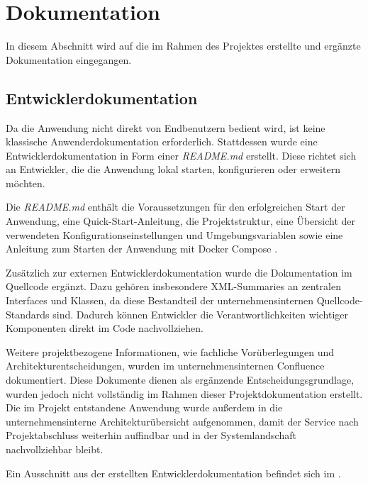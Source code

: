 \section{Dokumentation}
\label{sec:Dokumentation}
In diesem Abschnitt wird auf die im Rahmen des Projektes erstellte und ergänzte Dokumentation eingegangen.

\subsection{Entwicklerdokumentation}
\label{sec:Entwicklerdokumentation}
Da die Anwendung nicht direkt von Endbenutzern bedient wird, ist keine klassische Anwenderdokumentation erforderlich.
Stattdessen wurde eine Entwicklerdokumentation in Form einer \textit{README.md} erstellt.
Diese richtet sich an Entwickler, die die Anwendung lokal starten, konfigurieren oder erweitern möchten.
\par\smallskip
Die \textit{README.md} enthält die Voraussetzungen für den erfolgreichen Start der Anwendung,
eine Quick-Start-Anleitung, die Projektstruktur, eine Übersicht der verwendeten Konfigurationseinstellungen
und Umgebungsvariablen sowie eine Anleitung zum Starten der Anwendung mit Docker Compose \cite{DockerComposeDocs}.
\par\smallskip
Zusätzlich zur externen Entwicklerdokumentation wurde die Dokumentation im Quellcode ergänzt.
Dazu gehören insbesondere XML-Summaries an zentralen Interfaces und Klassen,
da diese Bestandteil der unternehmensinternen Quellcode-Standards sind.
Dadurch können Entwickler die Verantwortlichkeiten wichtiger Komponenten direkt im Code nachvollziehen.
\par\smallskip
Weitere projektbezogene Informationen, wie fachliche Vorüberlegungen und Architekturentscheidungen,
wurden im unternehmensinternen Confluence dokumentiert. 
Diese Dokumente dienen als ergänzende Entscheidungsgrundlage, wurden jedoch nicht vollständig im Rahmen dieser Projektdokumentation erstellt.
Die im Projekt entstandene Anwendung wurde außerdem in die unternehmensinterne Architekturübersicht aufgenommen,
damit der Service nach Projektabschluss weiterhin auffindbar und in der Systemlandschaft nachvollziehbar bleibt.
\par\smallskip
Ein Ausschnitt aus der erstellten Entwicklerdokumentation befindet sich im .